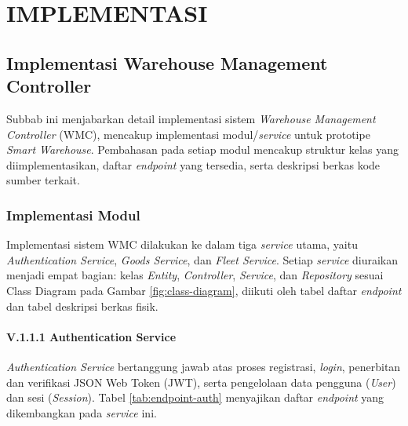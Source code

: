 \cleardoublepage
\chapter{IMPLEMENTASI}
\label{chap:implementasi}

\section{Implementasi Warehouse Management Controller}
Subbab ini menjabarkan detail implementasi sistem \textit{Warehouse Management Controller} (WMC), mencakup implementasi modul/\textit{service} untuk prototipe \textit{Smart Warehouse}. Pembahasan pada setiap modul mencakup struktur kelas yang diimplementasikan, daftar \textit{endpoint} yang tersedia, serta deskripsi berkas kode sumber terkait.

\subsection{Implementasi Modul}
Implementasi sistem WMC dilakukan ke dalam tiga \textit{service} utama, yaitu \textit{Authentication Service}, \textit{Goods Service}, dan \textit{Fleet Service}. Setiap \textit{service} diuraikan menjadi empat bagian: kelas \textit{Entity}, \textit{Controller}, \textit{Service}, dan \textit{Repository} sesuai Class Diagram pada Gambar \ref{fig:class-diagram}, diikuti oleh tabel daftar \textit{endpoint} dan tabel deskripsi berkas fisik.

\subsubsection*{V.1.1.1 Authentication Service}
\textit{Authentication Service} bertanggung jawab atas proses registrasi, \textit{login}, penerbitan dan verifikasi JSON Web Token (JWT), serta pengelolaan data pengguna (\textit{User}) dan sesi (\textit{Session}). Tabel \ref{tab:endpoint-auth} menyajikan daftar \textit{endpoint} yang dikembangkan pada \textit{service} ini.

